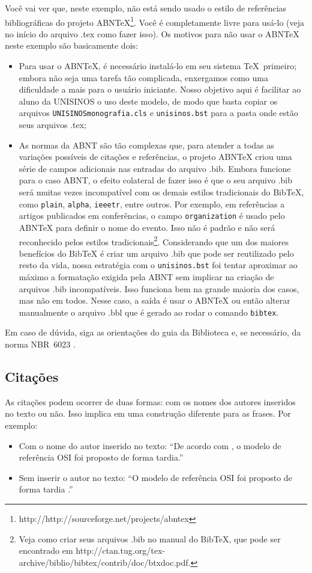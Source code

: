 \documentclass[twoside,english,brazilian]{UNISINOSartigo}
\begin{document}
Você vai ver que, neste exemplo, não está sendo usado o estilo de referências bibliográficas do projeto ABNTeX\footnote{http://http://sourceforge.net/projects/abntex}.  Você é completamente livre para usá-lo (veja no início do arquivo .tex como fazer isso).  Os motivos para não usar o ABNTeX neste exemplo são basicamente dois:
\begin{itemize}
	\item Para usar o ABNTeX, é necessário instalá-lo em seu sistema \TeX\ primeiro; embora não seja uma tarefa tão complicada, enxergamos como uma dificuldade a mais para o usuário iniciante.  Nosso objetivo aqui é facilitar ao aluno da UNISINOS o uso deste modelo, de modo que basta copiar os arquivos \texttt{UNISINOSmonografia.cls} e \texttt{unisinos.bst} para a pasta onde estão seus arquivos .tex;
	\item As normas da ABNT são tão complexas que, para atender a todas as variações possíveis de citações e referências, o projeto ABNTeX criou uma série de campos adicionais nas entradas do arquivo .bib.  Embora funcione para o caso ABNT, o efeito colateral de fazer isso é que o seu arquivo .bib será muitas vezes incompatível com os demais estilos tradicionais do BibTeX, como \texttt{plain}, \texttt{alpha}, \texttt{ieeetr}, entre outros.  Por exemplo, em referências a artigos publicados em conferências, o campo \texttt{organization} é usado pelo ABNTeX para definir o nome do evento.  Isso não é padrão e não será reconhecido pelos estilos tradicionais\footnote{Veja como criar seus arquivos .bib no manual do BibTeX, que pode ser encontrado em http://ctan.tug.org/tex-archive/biblio/bibtex/contrib/doc/btxdoc.pdf.}.  Considerando que um dos maiores benefícios do BibTeX é criar um arquivo .bib que pode ser reutilizado pelo resto da vida, nossa estratégia com o \texttt{unisinos.bst} foi tentar aproximar ao máximo a formatação exigida pela ABNT sem implicar na criação de arquivos .bib incompatíveis.  Isso funciona bem na grande maioria dos casos, mas não em todos.  Nesse caso, a saída é usar o ABNTeX ou então alterar manualmente o arquivo .bbl que é gerado ao rodar o comando \texttt{bibtex}.
\end{itemize}

Em caso de dúvida, siga as orientações do guia da Biblioteca \cite{Biblioteca12} e, se necessário, da norma NBR~6023 \cite{NBR6023:2002}.

\subsection{Citações}
As citações podem ocorrer de duas formas: com os nomes dos autores inseridos no texto ou não.  Isso implica em uma construção diferente para as frases.  Por exemplo:
\begin{itemize}
	\item Com o nome do autor inserido no texto: ``De acordo com , o modelo de referência OSI foi proposto de forma tardia.''
	\item Sem inserir o autor no texto: ``O modelo de referência OSI foi proposto de forma tardia \cite{Tanenbaum03}.''
\end{itemize}
\end{document}

